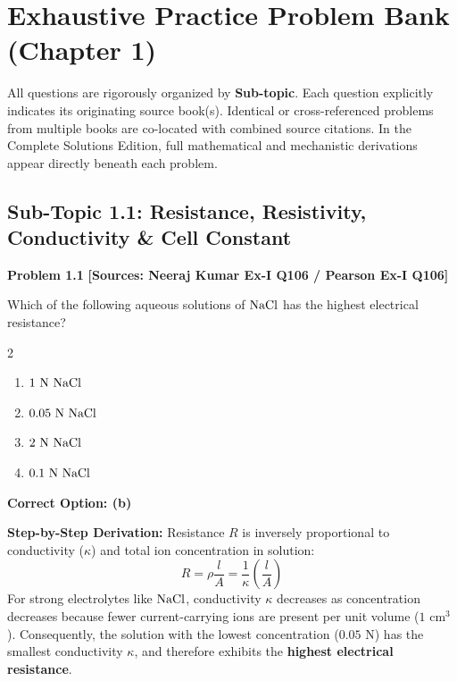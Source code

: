 \newpage
\section{Exhaustive Practice Problem Bank (Chapter 1)}
\label{sec:ch01_problem_bank}

\begin{tcolorbox}[enhanced,colback=subtlegreen,colframe=cengagegreen,arc=2mm,boxrule=1pt,title=\textbf{\large Organization of Practice Problems}]
All questions are rigorously organized by \textbf{Sub-topic}. Each question explicitly indicates its originating source book(s). Identical or cross-referenced problems from multiple books are co-located with combined source citations. In the Complete Solutions Edition, full mathematical and mechanistic derivations appear directly beneath each problem.
\end{tcolorbox}

\subsection{Sub-Topic 1.1: Resistance, Resistivity, Conductivity \& Cell Constant}

\begin{problembox}
\textbf{Problem 1.1} \hfill \textbf{[Sources: Neeraj Kumar Ex-I Q106 / Pearson Ex-I Q106]}

Which of the following aqueous solutions of $\ce{NaCl}$ has the highest electrical resistance?
\begin{multicols}{2}
\begin{enumerate}[label=(\alph*)]
    \item $1\text{ N } \ce{NaCl}$
    \item $0.05\text{ N } \ce{NaCl}$
    \item $2\text{ N } \ce{NaCl}$
    \item $0.1\text{ N } \ce{NaCl}$
\end{enumerate}
\end{multicols}
\end{problembox}
\begin{solution}
\textbf{Correct Option: (b)}

\textbf{Step-by-Step Derivation:}
Resistance $R$ is inversely proportional to conductivity ($\kappa$) and total ion concentration in solution:
\begin{equation*}
    R = \rho \frac{l}{A} = \frac{1}{\kappa} \left(\frac{l}{A}\right)
\end{equation*}
For strong electrolytes like $\ce{NaCl}$, conductivity $\kappa$ decreases as concentration decreases because fewer current-carrying ions are present per unit volume ($1\text{ cm}^3$). Consequently, the solution with the lowest concentration ($0.05\text{ N}$) has the smallest conductivity $\kappa$, and therefore exhibits the \textbf{highest electrical resistance}.
\end{solution}

